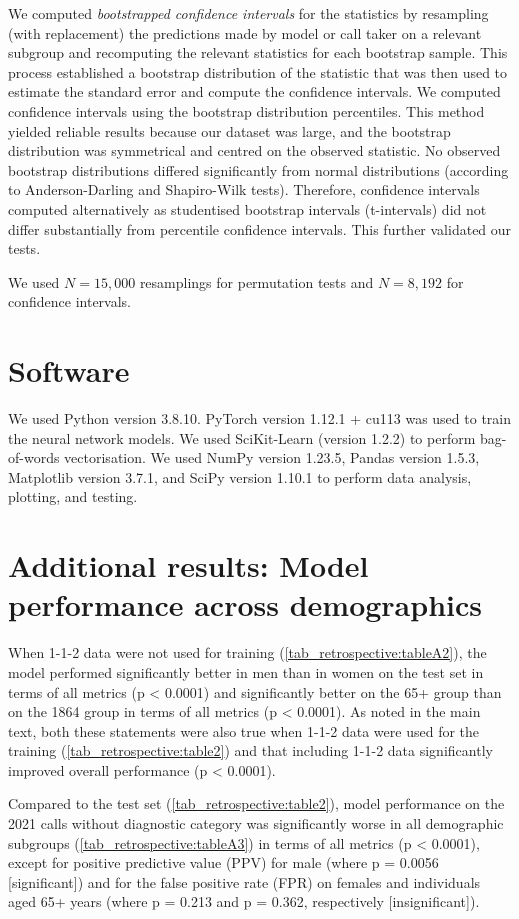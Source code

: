 {We computed \emph{bootstrapped confidence intervals} for the statistics by resampling (with replacement) the predictions made by model or call taker on a relevant subgroup and recomputing the relevant statistics for each bootstrap sample. This process established a bootstrap distribution of the statistic that was then used to estimate the standard error and compute the confidence intervals. We computed confidence intervals using the bootstrap distribution percentiles. This method yielded reliable results because our dataset was large, and the bootstrap distribution was symmetrical and centred on the observed statistic. No observed bootstrap distributions differed significantly from normal distributions (according to Anderson-Darling and Shapiro-Wilk tests). Therefore, confidence intervals computed alternatively as studentised bootstrap intervals (t-intervals) did not differ substantially from percentile confidence intervals. This further validated our tests.

We used $N=15,000$ resamplings for permutation tests and $N=8,192$ for confidence intervals.


\section{Software}

We used Python version 3.8.10. PyTorch version 1.12.1 + cu113 was used to train the neural network models. We used SciKit-Learn (version 1.2.2) to perform bag-of-words vectorisation. We used NumPy version 1.23.5, Pandas version 1.5.3, Matplotlib version 3.7.1, and SciPy version 1.10.1 to perform data analysis, plotting, and testing.


\section{Additional results: Model performance across demographics}

When 1-1-2 data were not used for training (\cref{tab_retrospective:tableA2}), the model performed significantly better in men than in women on the test set in terms of all metrics (p < 0.0001) and significantly better on the 65+ group than on the 1864 group in terms of all metrics (p < 0.0001). As noted in the main text, both these statements were also true when 1-1-2 data were used for the training (\cref{tab_retrospective:table2}) and that including 1-1-2 data significantly improved overall performance (p < 0.0001).

Compared to the test set (\cref{tab_retrospective:table2}), model performance on the 2021 calls without diagnostic category was significantly worse in all demographic subgroups (\cref{tab_retrospective:tableA3}) in terms of all metrics (p < 0.0001), except for positive predictive value (PPV) for male (where p = 0.0056 [significant]) and for the false positive rate (FPR) on females and individuals aged 65+ years (where p = 0.213 and p = 0.362, respectively [insignificant]).

}
